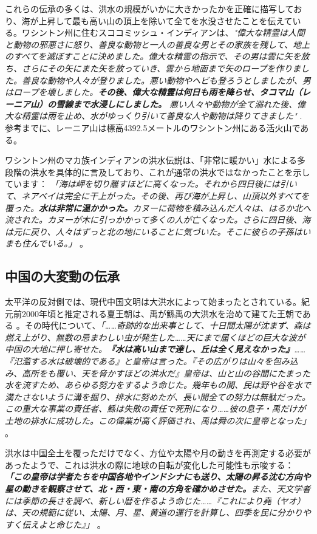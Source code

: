 \documentclass[10pt,twocolumn,letterpaper]{article}
\begin{document}
これらの伝承の多くは、洪水の規模がいかに大きかったかを正確に描写しており、海が上昇して最も高い山の頂上を除いて全てを水没させたことを伝えている。ワシントン州に住むスココミッシュ・インディアンは、\textit{"偉大な精霊は人間と動物の邪悪さに怒り、善良な動物と一人の善良な男とその家族を残して、地上のすべてを滅ぼすことに決めました。偉大な精霊の指示で、その男は雲に矢を放ち、さらにその矢にまた矢を放っていき、雲から地面まで矢のロープを作りました。善良な動物や人々が登りました。悪い動物やヘビも登ろうとしましたが、男はロープを壊しました。\textbf{その後、偉大な精霊は何日も雨を降らせ、タコマ山（レーニア山）の雪線まで水浸しにしました。} 悪い人々や動物が全て溺れた後、偉大な精霊は雨を止め、水がゆっくり引いて善良な人や動物は降りてきました"} \cite{3}. 参考までに、レーニア山は標高4392.5メートルのワシントン州にある活火山である。

ワシントン州のマカ族インディアンの洪水伝説は、「非常に暖かい」水による多段階の洪水を具体的に言及しており、これが通常の洪水ではなかったことを示しています： \textit{「海は岬を切り離すほどに高くなった。それから四日後には引いて、ネアベイは完全に干上がった。その後、再び海が上昇し、山頂以外すべてを覆った。\textbf{水は非常に温かかった。}カヌーに荷物を積み込んだ人々は、はるか北へ流された。カヌーが木に引っかかって多くの人が亡くなった。さらに四日後、海は元に戻り、人々はずっと北の地にいることに気づいた。そこに彼らの子孫はいまも住んでいる。」} \cite{3}。

\subsection{中国の大変動の伝承}

太平洋の反対側では、現代中国文明は大洪水によって始まったとされている。紀元前2000年頃と推定される夏王朝は、禹が鯀禹の大洪水を治めて建てた王朝である \cite{6}。その時代について、\textit{「……奇跡的な出来事として、十日間太陽が沈まず、森は燃え上がり、無数の忌まわしい虫が発生した……天にまで届くほどの巨大な波が中国の大地に押し寄せた。\textbf{『水は高い山まで達し、丘は全く見えなかった』}……『氾濫する水は破壊的である』と皇帝は言った。『その広がりは山々を包み込み、高所をも覆い、天を脅かすほどの洪水だ』皇帝は、山と山の谷間にたまった水を流すため、あらゆる努力をするよう命じた。幾年もの間、民は野や谷を水で満たさないように溝を掘り、排水に努めたが、長い間全ての努力は無駄だった。この重大な事業の責任者、鯀は失敗の責任で死刑になり……彼の息子・禹だけが土地の排水に成功した。この偉業が高く評価され、禹は舜の次に皇帝となった」} \cite{5}。

洪水は中国全土を覆っただけでなく、方位や太陽や月の動きを再測定する必要があったようで、これは洪水の際に地球の自転が変化した可能性も示唆する：\textit{ \textbf{「この皇帝は学者たちを中国各地やインドシナにも送り、太陽の昇る沈む方向や星の動きを観察させて、北・西・東・南の方角を確かめさせた。}また、天文学者には季節の長さを調べ、新しい暦を作るよう命じた……『これにより堯（ヤオ）は、天の規範に従い、太陽、月、星、黄道の運行を計算し、四季を民に分かりやすく伝えよと命じた』」} \cite{5}。
\end{document}
